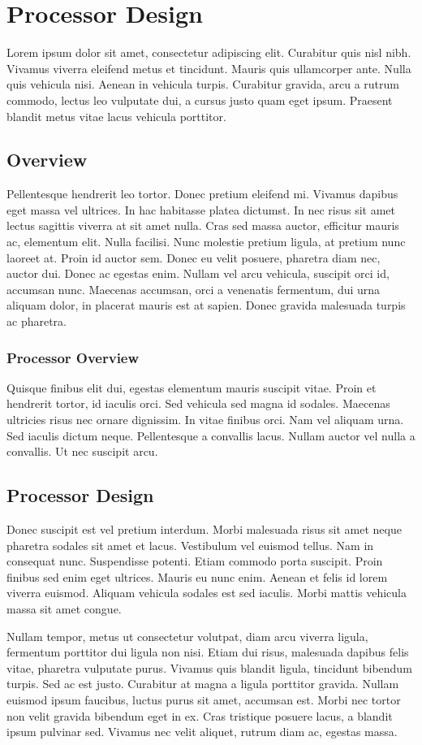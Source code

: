 
\chapter{Processor Design}
Lorem ipsum dolor sit amet, consectetur adipiscing elit. Curabitur quis nisl nibh. Vivamus viverra eleifend metus et tincidunt. Mauris quis ullamcorper ante. Nulla quis vehicula nisi. Aenean in vehicula turpis. Curabitur gravida, arcu a rutrum commodo, lectus leo vulputate dui, a cursus justo quam eget ipsum. Praesent blandit metus vitae lacus vehicula porttitor.
\section{Overview}
Pellentesque hendrerit leo tortor. Donec pretium eleifend mi. Vivamus dapibus eget massa vel ultrices. In hac habitasse platea dictumst. In nec risus sit amet lectus sagittis viverra at sit amet nulla. Cras sed massa auctor, efficitur mauris ac, elementum elit. Nulla facilisi. Nunc molestie pretium ligula, at pretium nunc laoreet at. Proin id auctor sem. Donec eu velit posuere, pharetra diam nec, auctor dui. Donec ac egestas enim. Nullam vel arcu vehicula, suscipit orci id, accumsan nunc. Maecenas accumsan, orci a venenatis fermentum, dui urna aliquam dolor, in placerat mauris est at sapien. Donec gravida malesuada turpis ac pharetra.
\subsection{Processor Overview}
Quisque finibus elit dui, egestas elementum mauris suscipit vitae. Proin et hendrerit tortor, id iaculis orci. Sed vehicula sed magna id sodales. Maecenas ultricies risus nec ornare dignissim. In vitae finibus orci. Nam vel aliquam urna. Sed iaculis dictum neque. Pellentesque a convallis lacus. Nullam auctor vel nulla a convallis. Ut nec suscipit arcu.
\section{Processor Design}
Donec suscipit est vel pretium interdum. Morbi malesuada risus sit amet neque pharetra sodales sit amet et lacus. Vestibulum vel euismod tellus. Nam in consequat nunc. Suspendisse potenti. Etiam commodo porta suscipit. Proin finibus sed enim eget ultrices. Mauris eu nunc enim. Aenean et felis id lorem viverra euismod. Aliquam vehicula sodales est sed iaculis. Morbi mattis vehicula massa sit amet congue.

Nullam tempor, metus ut consectetur volutpat, diam arcu viverra ligula, fermentum porttitor dui ligula non nisi. Etiam dui risus, malesuada dapibus felis vitae, pharetra vulputate purus. Vivamus quis blandit ligula, tincidunt bibendum turpis. Sed ac est justo. Curabitur at magna a ligula porttitor gravida. Nullam euismod ipsum faucibus, luctus purus sit amet, accumsan est. Morbi nec tortor non velit gravida bibendum eget in ex. Cras tristique posuere lacus, a blandit ipsum pulvinar sed. Vivamus nec velit aliquet, rutrum diam ac, egestas massa. 
